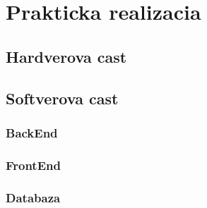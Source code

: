 \chapter{Prakticka realizacia}
\section{Hardverova cast}
\section{Softverova cast}
\subsection{BackEnd}
\subsection{FrontEnd}
\subsection{Databaza}
